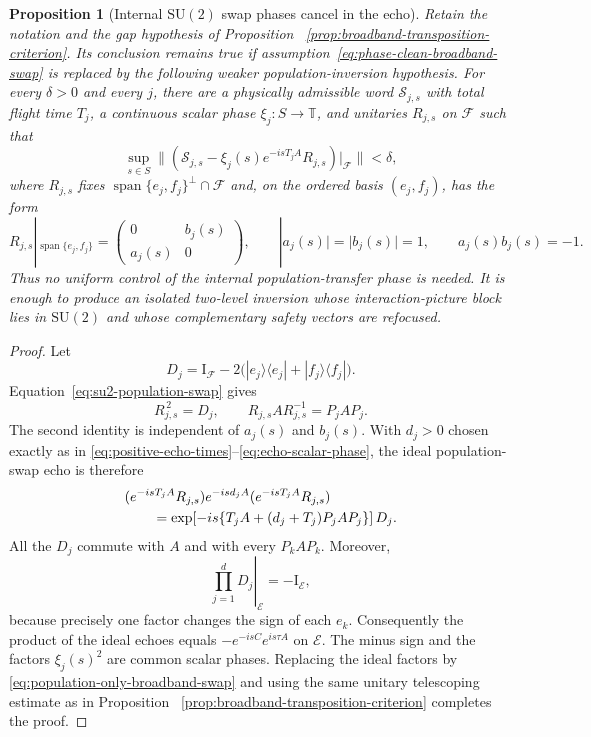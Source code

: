 \documentclass[11pt]{article}
\newtheorem{proposition}[theorem]{Proposition}
\theoremstyle{remark}
\newcommand{\T}{\mathbb T}
\newcommand{\Id}{\mathrm I}
\begin{document}
\begin{proposition}[Internal $\mathrm{SU}(2)$ swap phases cancel in the echo]
\label{prop:population-swap-phase-cancellation}
Retain the notation and the gap hypothesis of Proposition
~\ref{prop:broadband-transposition-criterion}.  Its conclusion remains true
if assumption~\eqref{eq:phase-clean-broadband-swap} is replaced by the
following weaker population-inversion hypothesis.  For every $\delta>0$ and
every $j$, there are a physically admissible word $\mathcal S_{j,s}$ with
total flight time $T_j$, a continuous scalar phase $\xi_j:S\to\T$, and
unitaries $R_{j,s}$ on $\mathcal F$ such that
\begin{equation}
 \sup_{s\in S}
 \|(\mathcal S_{j,s}
      -\xi_j(s)e^{-isT_jA}R_{j,s})|_{\mathcal F}\|<\delta,
 \label{eq:population-only-broadband-swap}
\end{equation}
where $R_{j,s}$ fixes
$\operatorname{span}\{e_j,f_j\}^{\perp}\cap\mathcal F$ and, on the ordered
basis $(e_j,f_j)$, has the form
\begin{equation}
 R_{j,s}|_{\operatorname{span}\{e_j,f_j\}}
 =
 \begin{pmatrix}0&b_j(s)\\ a_j(s)&0\end{pmatrix},
 \qquad |a_j(s)|=|b_j(s)|=1,
 \qquad a_j(s)b_j(s)=-1.
 \label{eq:su2-population-swap}
\end{equation}
Thus no uniform control of the internal population-transfer phase is needed.
It is enough to produce an isolated two-level inversion whose
interaction-picture block lies in $\mathrm{SU}(2)$ and whose complementary
safety vectors are refocused.
\end{proposition}

\begin{proof}
Let
\[
 D_j=\Id_{\mathcal F}
 -2\bigl(|e_j\rangle\langle e_j|+|f_j\rangle\langle f_j|\bigr).
\]
Equation~\eqref{eq:su2-population-swap} gives
\[
 R_{j,s}^{\,2}=D_j,
 \qquad
 R_{j,s}AR_{j,s}^{-1}=P_jAP_j.
\]
The second identity is independent of $a_j(s)$ and $b_j(s)$.  With
$d_j>0$ chosen exactly as in
\eqref{eq:positive-echo-times}--\eqref{eq:echo-scalar-phase}, the ideal
population-swap echo is therefore
\begin{align}
 &(e^{-isT_jA}R_{j,s})e^{-isd_jA}
   (e^{-isT_jA}R_{j,s})
 \notag\\
 &\qquad =
 \exp\!\left[
  -is\{T_jA+(d_j+T_j)P_jAP_j\}
 \right]D_j .
 \label{eq:population-swap-echo}
\end{align}
All the $D_j$ commute with $A$ and with every $P_kAP_k$.  Moreover,
\[
 \left.\prod_{j=1}^{d}D_j\right|_{\mathcal E}
 =-\Id_{\mathcal E},
\]
because precisely one factor changes the sign of each $e_k$.  Consequently
the product of the ideal echoes equals
$-e^{-isC}e^{is\tau A}$ on $\mathcal E$.  The minus sign and the factors
$\xi_j(s)^2$ are common scalar phases.  Replacing the ideal factors by
\eqref{eq:population-only-broadband-swap} and using the same unitary
telescoping estimate as in Proposition
~\ref{prop:broadband-transposition-criterion} completes the proof.
\end{proof}
\end{document}
